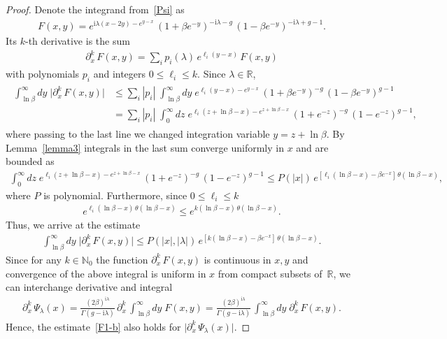 \documentclass[11pt]{article}
\numberwithin{equation}{section}
\theoremstyle{plain}
\theoremstyle{definition}
\renewcommand{\imath}{\mathrm{i}}
\begin{document}
\begin{proof}
	Denote the integrand from~\eqref{Psi} as
	\begin{align}
		F(x, y) = e^{\imath \lambda (x - 2y) - e^{y - x}} \, (1 + \beta e^{-y})^{- \imath \lambda - g} \, (1 - \beta e^{-y})^{-\imath \lambda + g - 1}.
	\end{align}
	Its $k$-th derivative is the sum
	\begin{align}
		\partial_x^k \, F(x, y) = \sum_i p_i(\lambda) \, e^{ \ell_i (y - x) } \,  F(x, y)
	\end{align}
	with polynomials $p_i$ and integers $0 \leq \ell_i \leq k$. Since $\lambda \in \mathbb{R}$,
	\begin{align}
		\begin{aligned}
			\int_{\ln \beta}^\infty dy \; \bigl| \partial_x^k \, F(x, y) \bigr| & \leq \sum_i |p_i| \; \int_{\ln \beta}^\infty dy \; e^{\ell_i(y - x) - e^{y - x}} \, (1 + \beta e^{-y})^{- g} \, (1 - \beta e^{-y})^{ g - 1} \\[6pt]
			& = \sum_i |p_i| \; \int_{0}^\infty dz \; e^{\ell_i (z + \ln \beta - x) - e^{z + \ln\beta - x}} \, (1 + e^{-z})^{- g} \, (1 - e^{-z})^{g - 1},
		\end{aligned}
	\end{align}
	where passing to the last line we changed integration variable \mbox{$y = z + \ln \beta$}. By Lemma~\ref{lemma3} integrals in the last sum converge uniformly in $x$ and are bounded as
	\begin{align}
		\int_{0}^\infty dz \; e^{\ell_i (z + \ln \beta - x) - e^{z + \ln\beta - x}} \, (1 + e^{-z})^{- g} \, (1 - e^{-z})^{g - 1} \leq P(|x|) \, e^{ [ \ell_i (\ln \beta - x) - \beta e^{- x} ] \, \theta(\ln \beta - x) },
	\end{align}
	where $P$ is polynomial. Furthermore, since $0 \leq \ell_i \leq k$
	\begin{align}
		e^{ \ell_i (\ln \beta - x) \, \theta(\ln \beta - x) } \leq e^{ k (\ln \beta - x) \, \theta(\ln \beta - x) }.
	\end{align}
	Thus, we arrive at the estimate
	\begin{align}\label{F1-b}
		\int_{\ln \beta}^\infty dy \; \bigl| \partial_x^k \, F(x, y) \bigr|  \leq  P(|x|, |\lambda|) \, e^{ [k (\ln \beta - x) - \beta e^{-x} ] \, \theta(\ln\beta-x)}.
	\end{align}
	Since for any $k \in \mathbb{N}_0$ the function $\partial_x^k \, F(x, y)$ is continuous in $x,y$ and convergence of the above integral is uniform in $x$ from compact subsets of~$\mathbb{R}$, we can interchange derivative and integral
	\begin{align}
		\partial_x^k \, \Psi_\lambda(x) = \frac{(2\beta)^{\imath \lambda}}{\Gamma(g - \imath \lambda)} \, \partial_x^k \, \int_{\ln \beta}^\infty dy \; F(x, y) = \frac{(2\beta)^{\imath \lambda}}{\Gamma(g - \imath \lambda)} \, \int_{\ln \beta}^\infty dy \; \partial_x^k \, F(x, y).
	\end{align}
	Hence, the estimate~\eqref{F1-b} also holds for $\bigl| \partial_x^k \, \Psi_\lambda(x)  \bigr|$. 
	

\end{proof}
\end{document}
